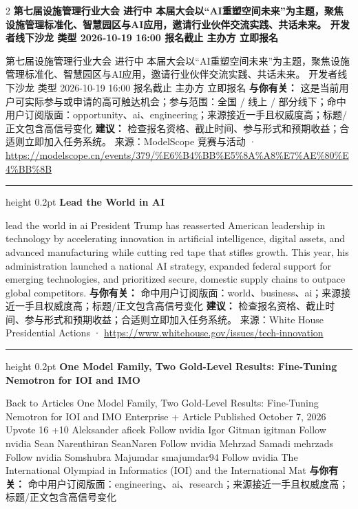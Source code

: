 \documentclass[10.5pt]{ctexart}
\begin{document}
\begin{multicols}{2}
{\large\bfseries 第七届设施管理行业大会 进行中 本届大会以“AI重塑空间未来”为主题，聚焦设施管理标准化、智慧园区与AI应用，邀请行业伙伴交流实践、共话未来。 开发者线下沙龙 类型 2026-10-19 16:00 报名截止 主办方 立即报名}\par
第七届设施管理行业大会 进行中 本届大会以“AI重塑空间未来”为主题，聚焦设施管理标准化、智慧园区与AI应用，邀请行业伙伴交流实践、共话未来。 开发者线下沙龙 类型 2026-10-19 16:00 报名截止 主办方 立即报名
\textbf{与你有关：} 这是当前用户可实际参与或申请的高可触达机会；参与范围：全国 / 线上 / 部分线下；命中用户订阅版面：opportunity、ai、engineering；来源接近一手且权威度高；标题/正文包含高信号变化
\textbf{建议：} 检查报名资格、截止时间、参与形式和预期收益；合适则立即加入任务系统。
{\footnotesize\color{ormuted} 来源：ModelScope 竞赛与活动 · \url{https://modelscope.cn/events/379/%E6%B4%BB%E5%8A%A8%E7%AE%80%E4%BB%8B}}
\vspace{2mm}
\hrule height 0.2pt
\vspace{2mm}
{\large\bfseries Lead the World in AI}\par
lead the world in ai President Trump has reasserted American leadership in technology by accelerating innovation in artificial intelligence, digital assets, and advanced manufacturing while cutting red tape that stifles growth. This year, his administration launched a national AI strategy, expanded federal support for emerging technologies, and prioritized secure, domestic supply chains to outpace global competitors.
\textbf{与你有关：} 命中用户订阅版面：world、business、ai；来源接近一手且权威度高；标题/正文包含高信号变化
\textbf{建议：} 检查报名资格、截止时间、参与形式和预期收益；合适则立即加入任务系统。
{\footnotesize\color{ormuted} 来源：White House Presidential Actions · \url{https://www.whitehouse.gov/issues/tech-innovation}}
\vspace{2mm}
\hrule height 0.2pt
\vspace{2mm}
{\large\bfseries One Model Family, Two Gold-Level Results: Fine-Tuning Nemotron for IOI and IMO}\par
Back to Articles One Model Family, Two Gold-Level Results: Fine-Tuning Nemotron for IOI and IMO Enterprise + Article Published October 7, 2026 Upvote 16 +10 Aleksander aficek Follow nvidia Igor Gitman igitman Follow nvidia Sean Narenthiran SeanNaren Follow nvidia Mehrzad Samadi mehrzads Follow nvidia Somshubra Majumdar smajumdar94 Follow nvidia The International Olympiad in Informatics (IOI) and the International Mat
\textbf{与你有关：} 命中用户订阅版面：engineering、ai、research；来源接近一手且权威度高；标题/正文包含高信号变化

\end{multicols}
\end{document}
